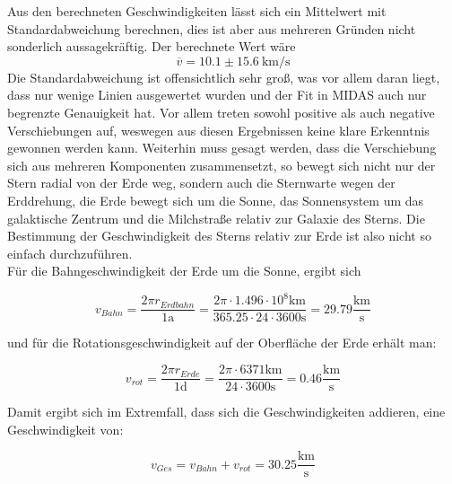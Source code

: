 Aus den berechneten Geschwindigkeiten lässt sich ein Mittelwert mit Standardabweichung berechnen, dies ist aber aus mehreren Gründen nicht sonderlich aussagekräftig. Der berechnete Wert wäre
\begin{equation}
\overline{v} = 10.1 \pm 15.6 \ \mathrm{km/s}
\end{equation}
Die Standardabweichung ist offensichtlich sehr groß, was vor allem daran liegt, dass nur wenige Linien ausgewertet wurden und der Fit in MIDAS auch nur begrenzte Genauigkeit hat. Vor allem treten sowohl positive als auch negative Verschiebungen auf, weswegen aus diesen Ergebnissen keine klare Erkenntnis gewonnen werden kann. 
Weiterhin muss gesagt werden, dass die Verschiebung sich aus mehreren Komponenten zusammensetzt, so bewegt sich nicht nur der Stern radial von der Erde weg, sondern auch die Sternwarte wegen der Erddrehung, die Erde bewegt sich um die Sonne, das Sonnensystem um das galaktische Zentrum und die Milchstraße relativ zur Galaxie des Sterns. Die Bestimmung der Geschwindigkeit des Sterns relativ zur Erde ist also nicht so einfach durchzuführen. \\

Für die Bahngeschwindigkeit der Erde um die Sonne, ergibt sich

\begin{equation}
v_{Bahn} = \frac{2 \pi r_{Erdbahn}}{1 \mathrm{a}} = \frac{2 \pi \cdot 1.496 \cdot 10^8 \mathrm{km}}{365.25 \cdot 24 \cdot 3600 \mathrm{s}} = 29.79 \frac{\mathrm{km}}{\mathrm{s}}
\end{equation}

und für die Rotationsgeschwindigkeit auf der Oberfläche der Erde erhält man:

\begin{equation}
v_{rot} = \frac{2 \pi r_{Erde}}{1 \mathrm{d}} = \frac{2 \pi \cdot 6371 \mathrm{km}}{24 \cdot 3600 \mathrm{s}} = 0.46 \frac{\mathrm{km}}{\mathrm{s}}
\end{equation}

Damit ergibt sich im Extremfall, dass sich die Geschwindigkeiten addieren, eine Geschwindigkeit von:

\begin{equation}
v_{Ges} = v_{Bahn} + v_{rot} = 30.25 \frac{\mathrm{km}}{\mathrm{s}}
\end{equation}